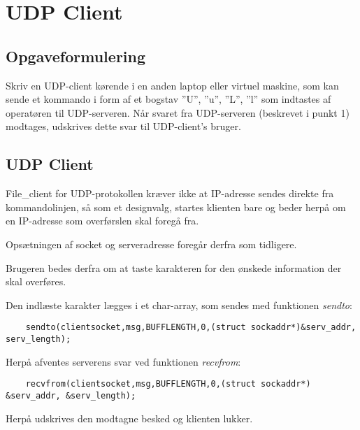 \chapter{UDP Client}

\section{Opgaveformulering}

Skriv en UDP-client kørende i en anden laptop eller virtuel maskine, som kan sende
et kommando i form af et bogstav ”U”, ”u”, ”L”, ”l” som indtastes af operatøren til
UDP-serveren. Når svaret fra UDP-serveren (beskrevet i punkt 1) modtages,
udskrives dette svar til UDP-client’s bruger. 


\section{UDP Client}

File\_client for UDP-protokollen kræver ikke at IP-adresse sendes direkte fra kommandolinjen, så som et designvalg, startes klienten bare og beder herpå om en IP-adresse som overførslen skal foregå fra. 

Opsætningen af socket og serveradresse foregår derfra som tidligere. 

Brugeren bedes derfra om at taste karakteren for den ønskede information der skal overføres. 

Den indlæste karakter lægges i et char-array, som sendes med funktionen \textit{sendto}:

\begin{lstlisting}
	sendto(clientsocket,msg,BUFFLENGTH,0,(struct sockaddr*)&serv_addr, serv_length);
\end{lstlisting}

Herpå afventes serverens svar ved funktionen \textit{recvfrom}:

\begin{lstlisting}
	recvfrom(clientsocket,msg,BUFFLENGTH,0,(struct sockaddr*) &serv_addr, &serv_length);
\end{lstlisting}

Herpå udskrives den modtagne besked og klienten lukker.
